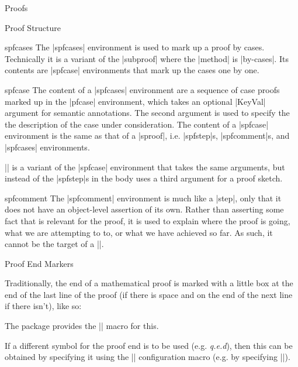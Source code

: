 \begin{sfragment}{Proofs}
\begin{sfragment}{Proof Structure}
  \begin{environment}{spfcases}
    The |spfcases| environment is used to mark up a proof by cases. Technically it is a
    variant of the |subproof| where the |method| is |by-cases|. Its contents are |spfcase|
    environments that mark up the cases one by one.
  \end{environment}

  \begin{environment}{spfcase}
    The content of a |spfcases| environment are a sequence of case proofs marked up in the
    |pfcase| environment, which takes an optional |KeyVal| argument for semantic
    annotations. The second argument is used to specify the the description of the case
    under consideration. The content of a |spfcase| environment is the same as that of a
    |sproof|, i.e. |spfstep|s, |spfcomment|s, and |spfcases| environments.
  \end{environment}
  
  \begin{function}{\spfcasesketch}
    |\spfcasesketch| is a variant of the |spfcase| environment that takes the same
    arguments, but instead of the |spfstep|s in the body uses a third argument for a proof
    sketch.
  \end{function}
  
  \begin{environment}{spfcomment}
    The |spfcomment| environment is much like a |step|, only that it does not have an
    object-level assertion of its own. Rather than asserting some fact that is relevant
    for the proof, it is used to explain where the proof is going, what we are attempting
    to to, or what we have achieved so far. As such, it cannot be the target of a
    |\premise|.
  \end{environment}
\end{sfragment}

\begin{sfragment}{Proof End Markers}

\begin{function}{\sproofend}
  Traditionally, the end of a mathematical proof is marked with a little box at the end of
  the last line of the proof (if there is space and on the end of the next line if there
  isn't), like so:\sproofend

  The  package provides the |\sproofend| macro for this.
\end{function}
  
\begin{variable}{\sProofEndSymbol}
  If a different symbol for the proof end is to be used (e.g. {\sl{q.e.d}}), then this can
  be obtained by specifying it using the |\sProofEndSymbol| configuration macro (e.g. by
  specifying ||).
\end{variable}


\end{sfragment}
\end{sfragment}
